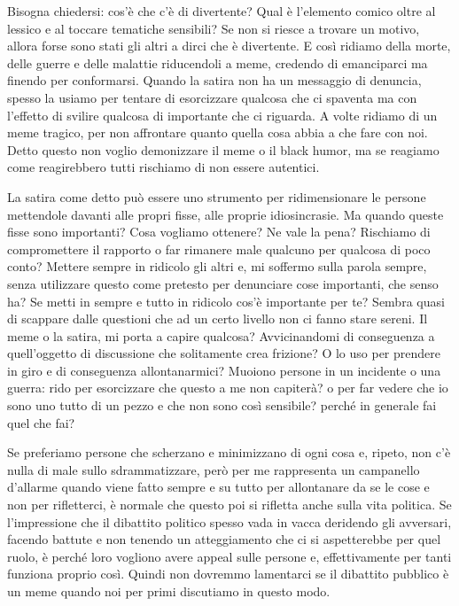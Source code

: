 \documentclass[12pt]{book} %
\begin{document}
\begin{mdframed}[linewidth=1pt]
\bigskip

Bisogna chiedersi: cos'è che c'è di divertente? Qual è l'elemento comico oltre al lessico e al
toccare tematiche sensibili? Se non si riesce a trovare un motivo, allora forse sono stati gli altri a dirci che è
divertente. E così ridiamo della morte, delle guerre e delle malattie riducendoli a meme, credendo di emanciparci ma
finendo per conformarsi. Quando la satira non ha un messaggio di denuncia, spesso la usiamo per tentare di esorcizzare
qualcosa che ci spaventa ma con l'effetto di svilire qualcosa di importante che ci riguarda. A volte ridiamo di un meme
tragico, per non affrontare quanto quella cosa abbia a che fare con noi. Detto questo non voglio demonizzare il meme o
il black humor, ma se reagiamo come reagirebbero tutti rischiamo di non essere autentici.

La satira come detto può essere uno strumento per ridimensionare le persone mettendole davanti alle propri fisse, alle proprie idiosincrasie. Ma quando queste fisse sono importanti? Cosa vogliamo ottenere? Ne vale la pena? Rischiamo di compromettere il rapporto o far rimanere male qualcuno per qualcosa di poco conto? Mettere sempre in ridicolo gli altri e, mi soffermo sulla parola sempre, senza utilizzare questo come pretesto per denunciare cose importanti, che senso ha? Se metti in sempre e tutto in ridicolo cos'è importante per te? Sembra quasi di scappare dalle questioni che ad un certo livello non ci fanno stare sereni.
Il meme o la satira, mi porta a capire qualcosa? Avvicinandomi di conseguenza a quell'oggetto di discussione che solitamente crea frizione? O lo uso per prendere in giro e di conseguenza allontanarmici? Muoiono persone in un incidente o una guerra: rido per esorcizzare che questo a me non capiterà? o per far vedere che io sono uno tutto di un pezzo e che non sono così sensibile? perché in generale fai quel che fai?

Se preferiamo persone che scherzano e minimizzano di ogni cosa e, ripeto, non c'è nulla di male sullo sdrammatizzare, però per me rappresenta un campanello d'allarme quando viene fatto sempre e su tutto per allontanare da se le cose e non per rifletterci, è normale che questo poi si rifletta anche sulla vita politica. Se l'impressione che il dibattito politico spesso vada in vacca deridendo gli avversari, facendo battute e non tenendo un atteggiamento che ci si aspetterebbe per quel ruolo, è perché loro vogliono avere appeal sulle persone e, effettivamente per tanti funziona proprio così.
Quindi non dovremmo lamentarci se il dibattito pubblico è un meme quando noi per primi discutiamo in questo modo.


\end{mdframed}
\end{document}
